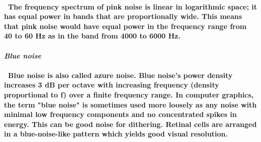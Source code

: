 \documentclass{article}
\begin{document}
  \paragraph{ \ The frequency spectrum of pink noise is linear in logarithmic space; it has equal power in bands that are proportionally wide. This means that pink noise would have equal power in the frequency range from 40 to 60 Hz as in the band from 4000 to 6000 Hz.}
  
  \paragraph{\textbf{\emph{Blue noise}}}
  \paragraph{ \ Blue noise is also called azure noise. Blue noise's power density increases 3 dB per octave with increasing frequency (density proportional to f) over a finite frequency range. In computer graphics, the term "blue noise" is sometimes used more loosely as any noise with minimal low frequency components and no concentrated spikes in energy. This can be good noise for dithering. Retinal cells are arranged in a blue-noise-like pattern which yields good visual resolution.}
  
\end{document}
